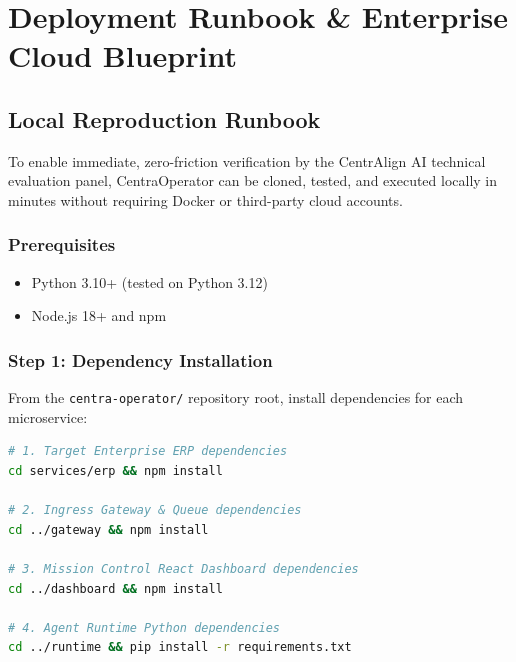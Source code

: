 \section{Deployment Runbook \& Enterprise Cloud Blueprint}
\label{sec:deployment}

\subsection{Local Reproduction Runbook}
To enable immediate, zero-friction verification by the CentrAlign AI technical evaluation panel, CentraOperator can be cloned, tested, and executed locally in minutes without requiring Docker or third-party cloud accounts.

\subsubsection{Prerequisites}
\begin{itemize}
  \item Python 3.10+ (tested on Python 3.12)
  \item Node.js 18+ and npm
\end{itemize}

\subsubsection{Step 1: Dependency Installation}
From the \texttt{centra-operator/} repository root, install dependencies for each microservice:
\begin{lstlisting}[language=bash, caption={Installing Microservice Dependencies}]
# 1. Target Enterprise ERP dependencies
cd services/erp && npm install

# 2. Ingress Gateway & Queue dependencies
cd ../gateway && npm install

# 3. Mission Control React Dashboard dependencies
cd ../dashboard && npm install

# 4. Agent Runtime Python dependencies
cd ../runtime && pip install -r requirements.txt
\end{lstlisting}

